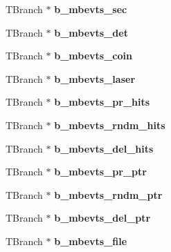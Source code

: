 \begin{DoxyCompactItemize}
\item 
\hypertarget{classg__clx_a8a0b2b747bcfca112170739a6bd7d51e}{T\-Branch $\ast$ {\bfseries b\-\_\-mbevts\-\_\-sec}}\label{classg__clx_a8a0b2b747bcfca112170739a6bd7d51e}

\item 
\hypertarget{classg__clx_a73c68a34850432a3402d572e91973f98}{T\-Branch $\ast$ {\bfseries b\-\_\-mbevts\-\_\-det}}\label{classg__clx_a73c68a34850432a3402d572e91973f98}

\item 
\hypertarget{classg__clx_aea150013c3823082bf94c6fe7c92c643}{T\-Branch $\ast$ {\bfseries b\-\_\-mbevts\-\_\-coin}}\label{classg__clx_aea150013c3823082bf94c6fe7c92c643}

\item 
\hypertarget{classg__clx_a654f79962aec1454c9e297b89f3a8beb}{T\-Branch $\ast$ {\bfseries b\-\_\-mbevts\-\_\-laser}}\label{classg__clx_a654f79962aec1454c9e297b89f3a8beb}

\item 
\hypertarget{classg__clx_a8604c42bddbbf63ea8cf7f3e1af36cf3}{T\-Branch $\ast$ {\bfseries b\-\_\-mbevts\-\_\-pr\-\_\-hits}}\label{classg__clx_a8604c42bddbbf63ea8cf7f3e1af36cf3}

\item 
\hypertarget{classg__clx_a5a8055b0d581696cd84f6a4b5b4c582f}{T\-Branch $\ast$ {\bfseries b\-\_\-mbevts\-\_\-rndm\-\_\-hits}}\label{classg__clx_a5a8055b0d581696cd84f6a4b5b4c582f}

\item 
\hypertarget{classg__clx_ab7d9842b440289a2274a926e7611bb2c}{T\-Branch $\ast$ {\bfseries b\-\_\-mbevts\-\_\-del\-\_\-hits}}\label{classg__clx_ab7d9842b440289a2274a926e7611bb2c}

\item 
\hypertarget{classg__clx_a9d647b0e87c194c34d426c949f610843}{T\-Branch $\ast$ {\bfseries b\-\_\-mbevts\-\_\-pr\-\_\-ptr}}\label{classg__clx_a9d647b0e87c194c34d426c949f610843}

\item 
\hypertarget{classg__clx_a992d0d4203d4ab5327153a81f199942f}{T\-Branch $\ast$ {\bfseries b\-\_\-mbevts\-\_\-rndm\-\_\-ptr}}\label{classg__clx_a992d0d4203d4ab5327153a81f199942f}

\item 
\hypertarget{classg__clx_a30a5429830731f534a82e57fd7c6c589}{T\-Branch $\ast$ {\bfseries b\-\_\-mbevts\-\_\-del\-\_\-ptr}}\label{classg__clx_a30a5429830731f534a82e57fd7c6c589}

\item 
\hypertarget{classg__clx_a76bc22e5d25b02dd39e4b22369bbcb46}{T\-Branch $\ast$ {\bfseries b\-\_\-mbevts\-\_\-file}}\label{classg__clx_a76bc22e5d25b02dd39e4b22369bbcb46}

\end{DoxyCompactItemize}



